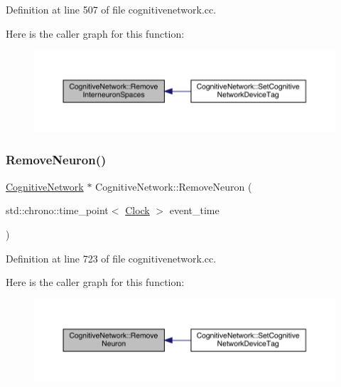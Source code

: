 Definition at line 507 of file cognitivenetwork.\+cc.

Here is the caller graph for this function\+:
\nopagebreak
\begin{figure}[H]
\begin{center}
\leavevmode
\includegraphics[width=350pt]{class_cognitive_network_a994c5f93447a82429809c89aa08d3dc1_icgraph}
\end{center}
\end{figure}
\mbox{\label{class_cognitive_network_a33e911ec87d902a8fd8bb6d9e23c4261}} 
\subsubsection{\texorpdfstring{Remove\+Neuron()}{RemoveNeuron()}}
{\footnotesize\ttfamily \hyperlink{class_cognitive_network}{Cognitive\+Network} $\ast$ Cognitive\+Network\+::\+Remove\+Neuron (\begin{DoxyParamCaption}\item[{std\+::chrono\+::time\+\_\+point$<$ \hyperlink{universe_8h_a0ef8d951d1ca5ab3cfaf7ab4c7a6fd80}{Clock} $>$}]{event\+\_\+time }\end{DoxyParamCaption})}



Definition at line 723 of file cognitivenetwork.\+cc.

Here is the caller graph for this function\+:
\nopagebreak
\begin{figure}[H]
\begin{center}
\leavevmode
\includegraphics[width=350pt]{class_cognitive_network_a33e911ec87d902a8fd8bb6d9e23c4261_icgraph}
\end{center}
\end{figure}
\mbox{\label{class_cognitive_network_a130985ff0aa14b2a17fc2c589e65f868}} 
